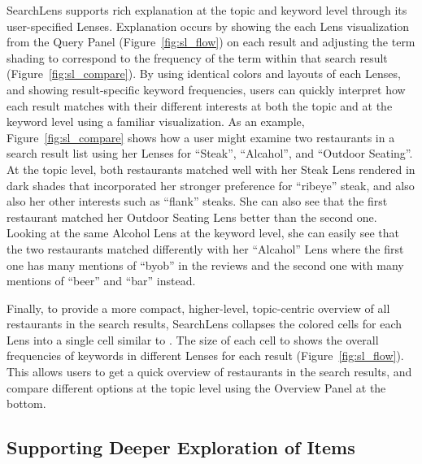 SearchLens supports rich explanation at the topic and keyword level through its user-specified Lenses. Explanation occurs by showing the each Lens visualization from the Query Panel (Figure~\ref{fig:sl_flow}) on each result and adjusting the term shading to correspond to the frequency of the term within that search result (Figure~\ref{fig:sl_compare}). By using identical colors and layouts of each Lenses, and showing result-specific keyword frequencies, users can quickly interpret how each result matches with their different interests at both the topic and at the keyword level using a familiar visualization. As an example, Figure~\ref{fig:sl_compare} shows how a user might examine two restaurants in a search result list using her Lenses for ``Steak'', ``Alcahol'', and ``Outdoor Seating''. At the topic level, both restaurants matched well with her Steak Lens rendered in dark shades that incorporated her stronger preference for ``ribeye'' steak, and also also her other interests such as ``flank'' steaks. She can also see that the first restaurant matched her Outdoor Seating Lens better than the second one. Looking at the same Alcohol Lens at the keyword level, she can easily see that the two restaurants matched differently with her ``Alcahol'' Lens where the first one has many mentions of ``byob'' in the reviews and the second one with many mentions of ``beer'' and ``bar'' instead.


Finally, to provide a more compact, higher-level, topic-centric overview of all restaurants in the search results, SearchLens collapses the colored cells for each Lens into a single cell similar to \cite{hoeber2006comparative}. The size of each cell to shows the overall frequencies of keywords in different Lenses for each result (Figure~\ref{fig:sl_flow}). This allows users to get a quick overview of restaurants in the search results, and compare different options at the topic level using the Overview Panel at the bottom.


\subsection{Supporting Deeper Exploration of Items}
 

